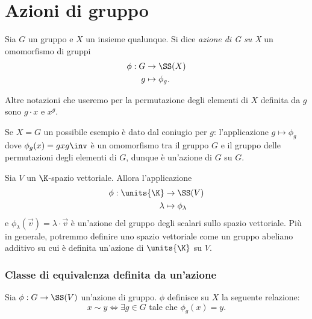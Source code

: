 \section{Azioni di gruppo}

\begin{definition}
     Sia $G$ un gruppo e $X$ un insieme qualunque. Si dice \emph{azione di G su X} un omomorfismo di gruppi \begin{align*}
        \phi : G &\to \SS(X)\\
        g &\mapsto \phi_g.
    \end{align*}
\end{definition}

Altre notazioni che useremo per la permutazione degli elementi di $X$ definita da $g$ sono $g \cdot x$ e $x^g$.

\begin{example}
    Se $X = G$ un possibile esempio è dato dal coniugio per $g$: l'applicazione $g \mapsto \phi_g$ dove $\phi_g(x) = gxg\inv$ è un omomorfismo tra il gruppo $G$ e il gruppo delle permutazioni degli elementi di $G$, dunque è un'azione di $G$ su $G$.
\end{example}
\begin{example}
    Sia $V$ un $\K$-spazio vettoriale. Allora l'applicazione \begin{align*}
        \phi : \units{\K} &\to \SS(V)\\
        \lambda &\mapsto \phi_\lambda
    \end{align*} e $\phi_\lambda(\vec{v}) = \lambda\cdot \vec v$ è un'azione del gruppo degli scalari sullo spazio vettoriale. Più in generale, potremmo definire uno spazio vettoriale come un gruppo abeliano additivo su cui è definita un'azione di $\units{\K}$ su $V$.
\end{example}

\subsubsection{Classe di equivalenza definita da un'azione}
Sia $\phi : G \to \SS(V)$ un'azione di gruppo. $\phi$ definisce su $X$ la seguente relazione: \begin{equation}\label{eq:eq_rel_group_action}
    x \sim y \iff \exists g \in G \text{ tale che } \phi_g(x) = y.    
\end{equation}

